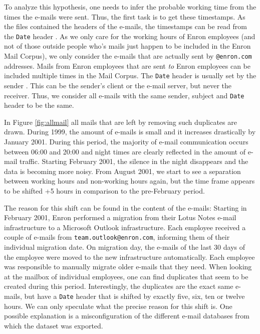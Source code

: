\documentclass{article}
\begin{document}
To analyze this hypothesis, one needs to infer the probable working time from the
times the e-mails were sent. Thus, the first task is to get these timestamps. As
the files contained the headers of the e-mails, the timestamps can be read from
the \texttt{Date} header \citep{rfc5322}. As we only care for the working hours
of Enron employees (and not of those outside people who's mails just happen to
be included in the Enron Mail Corpus), we only consider the e-mails that are
actually sent by \texttt{@enron.com} addresses. Mails from Enron employees that
are sent \emph{to} Enron employees can be included multiple times in the Mail
Corpus. The \texttt{Date} header is usually set by the sender \citep{rfc2821}.
This can be the sender's client or the e-mail server, but never the receiver.
Thus, we consider all e-mails with the same sender, subject and \texttt{Date}
header to be the same.

In Figure \ref{fig:allmail} all mails that are left by removing such duplicates
are drawn. During 1999, the amount of e-mails is small and it increases
drastically by January 2001. During this period, the majority of e-mail
communication occurs between 06:00 and 20:00 and night times are clearly
reflected in the amount of e-mail traffic. Starting February 2001, the silence
in the night disappears and the data is becoming more noisy. From August 2001,
we start to see a separation between working hours and non-working hours again,
but the time frame appears to be shifted +5 hours in comparison to the
pre-February period.

The reason for this shift can be found in the content of the e-mails: Starting
in February 2001, Enron performed a migration from their Lotus Notes e-mail
infrastructure to a Microsoft Outlook infrastructure. Each employee received a
couple of e-mails from \texttt{team.outlook@enron.com}, informing them of their
individual migration date. On migration day, the e-mails of the last 30 days of
the employee were moved to the new infrastructure automatically. Each employee
was responsible to manually migrate older e-mails that they need. When looking
at the mailbox of individual employees, one can find duplicates that seem to be
created during this period. Interestingly, the duplicates are the exact same
e-mails, but have a \texttt{Date} header that is shifted by exactly five, six,
ten or twelve hours. We can only speculate what the precise reason for this
shift is. One possible explanation is a misconfiguration of the different e-mail
databases from which the dataset was exported.
\end{document}
